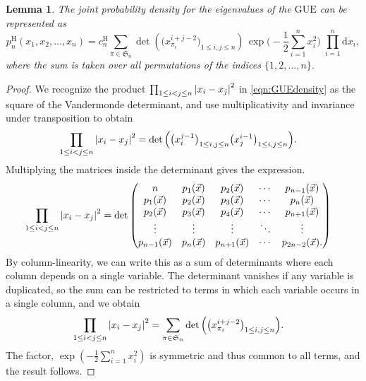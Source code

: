 \documentclass[pdftex, oneside, 10pt, letterpaper]{amsart}
\theoremstyle{plain}
\newtheorem{lemma}{Lemma}
\theoremstyle{definition}
\theoremstyle{remark}
\begin{document}
\begin{lemma}\label{lem:nonsymGUE} 
  The joint probability density for the eigenvalues of the
  {\ensuremath{\mathrm{GUE}}}{} can be represented as
  \begin{equation}\label{eqn:nonsymGUE}
    p_n^{\mathrm{H}}(x_1,x_2,\dotsc,x_n) =
       c_n^{\mathrm{H}}\sum_{\pi\in\mathfrak{S}_n}
       {\det\left(\big(x_{\pi_i}^{i+j-2}\big)_{1\leq i,j\leq n}\right)}
       \,\exp\Big(-\frac12\sum_{i=1}^n x_i^2\Big)
       {\;\prod_{i={1}}^{{n}} \mathrm{d}{{x}}_i},
  \end{equation}
  where the sum is taken over all permutations of the indices $\{1,2,\dotsc,n\}$.
\end{lemma}

\begin{proof}
  We recognize the product $\prod_{1\leq{}i<j\leq{}n}{{\ifx\relax{}\relax\else\fi}{{}}\lvert{x_i-x_j}{{}}\rvert}^2$
  in \eqref{eqn:GUEdensity} as the square of the Vandermonde
  determinant, and use multiplicativity and invariance under
  transposition to obtain
  \begin{align*}
    {\prod_{1\leq i<j\leq n}{{\ifx\relax{}\relax\else\fi}{{}}\lvert{x_i-x_j}{{}}\rvert}^2}
    &={\det\left(\big(x_i^{j-1}\big)_{1\leq i,j\leq
          n}\big(x_j^{i-1}\big)_{1\leq i,j\leq n}\right)}.
  \end{align*}
  Multiplying the matrices inside the determinant gives the expression.
  \begin{align*}
    \prod_{1\leq{}i<j\leq{}n}{{\ifx\relax{}\relax\else\fi}{{}}\lvert{x_i-x_j}{{}}\rvert}^2&=
    {\det\begin{pmatrix} n & p_1(\vec{x}) & p_2(\vec{x})
      & \cdots & p_{n-1}(\vec{x}) \\ p_1(\vec{x}) & p_2(\vec{x}) &
      p_3(\vec{x}) & \cdots & p_{n}(\vec{x}) \\ p_2(\vec{x}) &
      p_3(\vec{x}) & p_4(\vec{x}) & \cdots & p_{n+1}(\vec{x})
      \\ \vdots & \vdots & \vdots & \ddots & \vdots
      \\ p_{n-1}(\vec{x}) & p_n(\vec{x}) & p_{n+1}(\vec{x}) & \cdots &
      p_{2n-2}(\vec{x}).
      \end{pmatrix}}
  \end{align*}
  By column-linearity, we can write this as a sum of determinants
  where each column depends on a single variable.  The determinant
  vanishes if any variable is duplicated, so the sum can be restricted
  to terms in which each variable occurs in a single column, and we
  obtain
  \begin{align*}
    \prod_{1\leq{}i<j\leq{}n}{{\ifx\relax{}\relax\else\fi}{{}}\lvert{x_i-x_j}{{}}\rvert}^2&=
    \sum_{\pi\in\mathfrak{S}_n}
       {\det\left(\big(x_{\pi_i}^{i+j-2}\big)_{1\leq i,j\leq n}\right)}.
  \end{align*}
  The factor, $\exp\left(-\frac12\sum_{i=1}^nx_i^2\right)$ is
  symmetric and thus common to all terms, and the result follows.
\end{proof}
\end{document}
